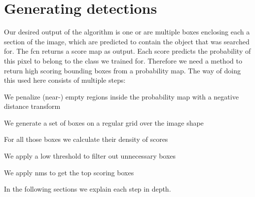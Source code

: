 \section{Generating detections}
\label{sec:pipeline:eval}
Our desired output of the algorithm is one or are multiple boxes enclosing each a section of the image, which are predicted to contain the object that was searched for. The \gls{fcn} returns a score map as output. Each score predicts the probability of this pixel to belong to the class we trained for. Therefore we need a method to return high scoring bounding boxes from a probability map. The way of doing this used here consists of multiple steps:\\
\begin{my_list_num}
    \item We penalize (near-) empty regions inside the probability map with a negative distance transform
    \item We generate a set of boxes on a regular grid over the image shape
    \item For all those boxes we calculate their density of scores
    \item We apply a low threshold to filter out unnecessary boxes
    \item We apply \gls{nms} to get the top scoring boxes
\end{my_list_num}
In the following sections we explain each step in depth.

